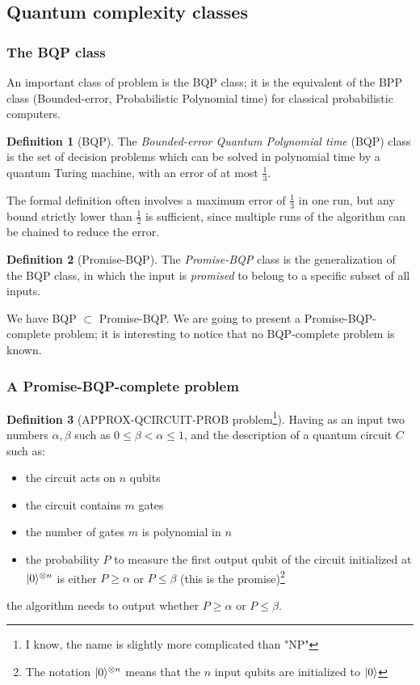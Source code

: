 \documentclass[12pt,a4paper]{article}
\theoremstyle{plain}
\theoremstyle{definition}
\newtheorem*{definition}{Definition}
\DeclarePairedDelimiter\ket{\lvert}{\rangle}
\begin{document}
\subsection{Quantum complexity classes}
\subsubsection{The BQP class}
An important class of problem is the BQP class; it is the equivalent of the BPP class (Bounded-error, Probabilistic Polynomial time) for classical probabilistic computers.

\begin{definition}[BQP] 
    The \emph{Bounded-error Quantum Polynomial time} (BQP) class is the set of decision problems which can be solved in polynomial time by a quantum Turing machine, with an error of at most $\frac{1}{3}$. 
\end{definition}
The formal definition often involves a maximum error of $\frac{1}{3}$ in one run, but any bound strictly lower than $\frac{1}{2}$ is sufficient, since multiple runs of the algorithm can be chained to reduce the error.

\begin{definition}[Promise-BQP]
    The \emph{Promise-BQP} class is the generalization of the BQP class, in which the input is \emph{promised} to belong to a specific subset of all inputs.
\end{definition}

We have BQP $\subset$ Promise-BQP. We are going to present a Promise-BQP-complete problem; it is interesting to notice that no BQP-complete problem is known.

\subsubsection{A Promise-BQP-complete problem}
\begin{definition}[APPROX-QCIRCUIT-PROB problem\footnote{I know, the name is slightly more complicated than "NP"}]
    Having as an input two numbers $\alpha, \beta$ such as $0\leq\beta<\alpha\leq 1$, and the description of a quantum circuit $C$ such as:
    \begin{itemize}[label=--, noitemsep]
        \item the circuit acts on $n$ qubits
        \item the circuit contains $m$ gates
        \item the number of gates $m$ is polynomial in $n$
        \item the probability $P$ to measure the first output qubit of the circuit initialized at $\ket{0}^{\otimes n}$ is either $P\geq\alpha$ or $P\leq\beta$ (this is the promise)\footnote{The notation $\ket{0}^{\otimes n}$ means that the $n$ input qubits are initialized to $\ket{0}$}
    \end{itemize}
    the algorithm needs to output whether $P\geq\alpha$ or $P\leq\beta$.
\end{definition}
\end{document}
